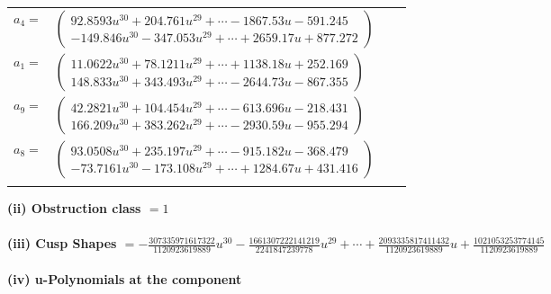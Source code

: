 \documentclass[1p]{elsarticle_modified}
\theoremstyle{definition}
\begin{document}
\begin{tabular}{m{7pt} m{180pt} m{7pt} m{180pt} }
\flushright $a_{4}=$&$\begin{pmatrix}92.8593 u^{30}+204.761 u^{29}+\cdots-1867.53 u-591.245\\-149.846 u^{30}-347.053 u^{29}+\cdots+2659.17 u+877.272\end{pmatrix}$ \\
\flushright $a_{1}=$&$\begin{pmatrix}11.0622 u^{30}+78.1211 u^{29}+\cdots+1138.18 u+252.169\\148.833 u^{30}+343.493 u^{29}+\cdots-2644.73 u-867.355\end{pmatrix}$ \\
\flushright $a_{9}=$&$\begin{pmatrix}42.2821 u^{30}+104.454 u^{29}+\cdots-613.696 u-218.431\\166.209 u^{30}+383.262 u^{29}+\cdots-2930.59 u-955.294\end{pmatrix}$ \\
\flushright $a_{8}=$&$\begin{pmatrix}93.0508 u^{30}+235.197 u^{29}+\cdots-915.182 u-368.479\\-73.7161 u^{30}-173.108 u^{29}+\cdots+1284.67 u+431.416\end{pmatrix}$\\&\end{tabular}
\flushleft \textbf{(ii) Obstruction class $= 1$}\\~\\
\flushleft \textbf{(iii) Cusp Shapes $= -\frac{307335971617322}{1120923619889} u^{30}-\frac{1661307222141219}{2241847239778} u^{29}+\cdots+\frac{2093335817411432}{1120923619889} u+\frac{1021053253774145}{1120923619889}$}\\~\\
\newpage\renewcommand{\arraystretch}{1}
\flushleft \textbf{(iv) u-Polynomials at the component}\newline \\
\end{document}
